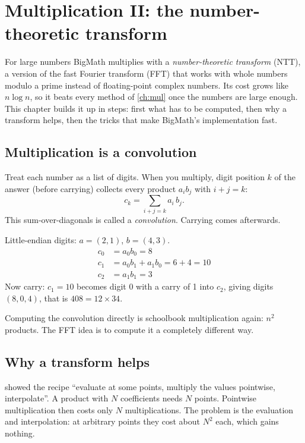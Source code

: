\chapter{Multiplication II: the number-theoretic transform}
\label{ch:ntt}

For large numbers BigMath multiplies with a \emph{number-theoretic transform} (NTT), a
version of the fast Fourier transform (FFT) that works with whole numbers modulo a prime
instead of floating-point complex numbers. Its cost grows like $n \log n$, so it beats
every method of \cref{ch:mul} once the numbers are large enough. This chapter builds it up
in steps: first what has to be computed, then why a transform helps, then the tricks that
make BigMath's implementation fast.

\section{Multiplication is a convolution}

Treat each number as a list of digits. When you multiply, digit position $k$ of the
answer (before carrying) collects every product $a_i b_j$ with $i + j = k$:
\[
c_k = \sum_{i + j = k} a_i\, b_j .
\]
This sum-over-diagonals is called a \emph{convolution}. Carrying comes afterwards.

\begin{example}
Little-endian digits: $a = (2, 1)$, $b = (4, 3)$.
\begin{align*}
c_0 &= a_0 b_0 = 8\\
c_1 &= a_0 b_1 + a_1 b_0 = 6 + 4 = 10\\
c_2 &= a_1 b_1 = 3
\end{align*}
Now carry: $c_1 = 10$ becomes digit 0 with a carry of 1 into $c_2$, giving digits
$(8, 0, 4)$, that is $408 = 12 \times 34$.
\end{example}

Computing the convolution directly is schoolbook multiplication again: $n^2$ products.
The FFT idea is to compute it a completely different way.

\section{Why a transform helps}

 showed the recipe ``evaluate at some points, multiply the values
pointwise, interpolate''. A product with $N$ coefficients needs $N$ points. Pointwise
multiplication then costs only $N$ multiplications. The problem is the evaluation and
interpolation: at arbitrary points they cost about $N^2$ each, which gains nothing.

